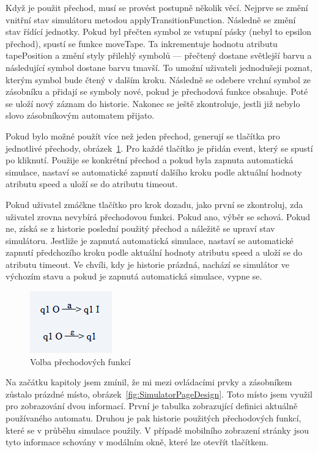 Když je použit přechod, musí se provést postupně několik věcí. Nejprve se změní vnitřní stav simulátoru metodou applyTransitionFunction. Následně se změní stav řídící jednotky. Pokud byl přečten symbol ze vstupní pásky (nebyl to epsilon přechod), spustí se funkce moveTape. Ta inkrementuje hodnotu atributu tapePosition a změní styly přilehlý symbolů --- přečtený dostane světlejší barvu a následující symbol dostane barvu tmavší. To umožní uživateli jednodušeji poznat, kterým symbol bude čtený v dalším kroku. Následně se odebere vrchní symbol ze zásobníku a přidají se symboly nové, pokud je přechodová funkce obsahuje. Poté se uloží nový záznam do historie. Nakonec se ještě zkontroluje, jestli již nebylo slovo zásobníkovým automatem přijato.

Pokud bylo možné použít více než jeden přechod, generují se tlačítka pro jednotlivé přechody, obrázek~\ref{fig:TransitionFunctionChoosing}. Pro každé tlačítko je přidán event, který se spustí po kliknutí. Použije se konkrétní přechod a pokud byla zapnuta automatická simulace, nastaví se automatické zapnutí dalšího kroku podle aktuální hodnoty atributu speed a uloží se do atributu timeout.

Pokud uživatel zmáčkne tlačítko pro krok dozadu, jako první se zkontroluj, zda uživatel zrovna nevybírá přechodovou funkci. Pokud ano, výběr se schová. Pokud ne, získá se z historie poslední použitý přechod a náležitě se upraví stav simulátoru. Jestliže je zapnutá automatická simulace, nastaví se automatické zapnutí předchozího kroku podle aktuální hodnoty atributu speed a uloží se do atributu timeout. Ve chvíli, kdy je historie prázdná, nachází se simulátor ve výchozím stavu a pokud je zapnutá automatická simulace, vypne se.

\begin{figure}[h]
    \centering
    \includegraphics{Figures/PrntScrn_TransitionFunctionChoosing.png}
    \caption{Volba přechodových funkcí}\label{fig:TransitionFunctionChoosing}
\end{figure}

Na začátku kapitoly jsem zmínil, že mi mezi ovládacími prvky a zásobníkem zůstalo prázdné místo, obrázek~\ref{fig:SimulatorPageDesign}. Toto místo jsem využil pro zobrazování dvou informací. První je tabulka zobrazující definici aktuálně používaného automatu. Druhou je pak historie použitých přechodových funkcí, které se v průběhu simulace použily. V případě mobilního zobrazení stránky jsou tyto informace schovány v modálním okně, které lze otevřít tlačítkem.


